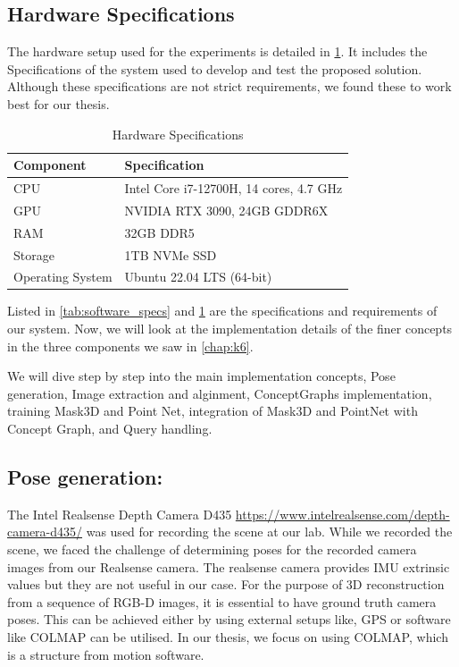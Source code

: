 \subsection{Hardware Specifications}
The hardware setup used for the experiments is detailed in \ref{tab:hardware_specs}. It includes the Specifications of the system
used to develop and test the proposed solution. Although these specifications are not strict requirements, we found these to work best for our
thesis.

\begin{table}[ht]
    \centering
    \caption{Hardware Specifications}
    \label{tab:hardware_specs}
    \begin{tabular}{ll}
        \toprule
        \textbf{Component}      & \textbf{Specification}              \\
        \midrule
        CPU                     & Intel Core i7-12700H, 14 cores, 4.7 GHz \\
        GPU                     & NVIDIA RTX 3090, 24GB GDDR6X          \\
        RAM                     & 32GB DDR5                             \\
        Storage                 & 1TB NVMe SSD                          \\
        Operating System        & Ubuntu 22.04 LTS (64-bit)             \\
        \bottomrule
    \end{tabular}
\end{table}



Listed in \cref{tab:software_specs} and \cref{tab:hardware_specs} are the specifications and requirements of our system. Now, we will look at the implementation details of the finer concepts in the 
three components we saw in \cref{chap:k6}.

We will dive step by step into the main implementation concepts, Pose generation, Image extraction and alginment, ConceptGraphs implementation, 
training Mask3D and Point Net, integration of Mask3D and PointNet with Concept Graph, and Query handling.

\subsection{Pose generation:}
The Intel Realsense Depth Camera D435 \url{https://www.intelrealsense.com/depth-camera-d435/} was used for recording the scene at our lab. 
While we recorded the scene, we faced the challenge of determining poses for the recorded camera images from our Realsense camera. The realsense camera provides IMU extrinsic
values but they are not useful in our case. For the purpose of 3D reconstruction from a sequence of RGB-D images, it is essential to have ground truth camera poses. This 
can be achieved either by using external setups like, GPS or software like COLMAP can be utilised. In our thesis, we focus on using COLMAP,
which is a structure from motion software. 

